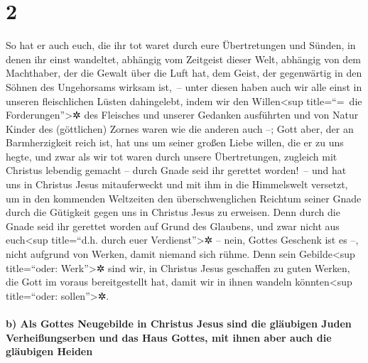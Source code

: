 \hypertarget{section-1}{%
\section{2}\label{section-1}}

 So hat er auch euch, die ihr tot waret durch eure
Übertretungen und Sünden,  in denen ihr einst wandeltet,
abhängig vom Zeitgeist dieser Welt, abhängig von dem Machthaber, der die
Gewalt über die Luft hat, dem Geist, der gegenwärtig in den Söhnen des
Ungehorsams wirksam ist,~--  unter diesen haben auch wir
alle einst in unseren fleischlichen Lüsten dahingelebt, indem wir den
Willen\textless sup title=``=~die Forderungen''\textgreater✲ des
Fleisches und unserer Gedanken ausführten und von Natur Kinder des
(göttlichen) Zornes waren wie die anderen auch --;  Gott
aber, der an Barmherzigkeit reich ist, hat uns um seiner großen Liebe
willen, die er zu uns hegte,  und zwar als wir tot waren
durch unsere Übertretungen, zugleich mit Christus lebendig gemacht --
durch Gnade seid ihr gerettet worden!~--  und hat uns in
Christus Jesus mitauferweckt und mit ihm in die Himmelswelt versetzt,
 um in den kommenden Weltzeiten den überschwenglichen
Reichtum seiner Gnade durch die Gütigkeit gegen uns in Christus Jesus zu
erweisen.  Denn durch die Gnade seid ihr gerettet worden
auf Grund des Glaubens, und zwar nicht aus euch\textless sup
title=``d.h. durch euer Verdienst''\textgreater✲ -- nein, Gottes
Geschenk ist es --,  nicht aufgrund von Werken, damit
niemand sich rühme.  Denn sein Gebilde\textless sup
title=``oder: Werk''\textgreater✲ sind wir, in Christus Jesus geschaffen
zu guten Werken, die Gott im voraus bereitgestellt hat, damit wir in
ihnen wandeln könnten\textless sup title=``oder: sollen''\textgreater✲.

\hypertarget{b-als-gottes-neugebilde-in-christus-jesus-sind-die-gluxe4ubigen-juden-verheiuxdfungserben-und-das-haus-gottes-mit-ihnen-aber-auch-die-gluxe4ubigen-heiden}{%
\paragraph{b) Als Gottes Neugebilde in Christus Jesus sind die gläubigen
Juden Verheißungserben und das Haus Gottes, mit ihnen aber auch die
gläubigen
Heiden}\label{b-als-gottes-neugebilde-in-christus-jesus-sind-die-gluxe4ubigen-juden-verheiuxdfungserben-und-das-haus-gottes-mit-ihnen-aber-auch-die-gluxe4ubigen-heiden}}

